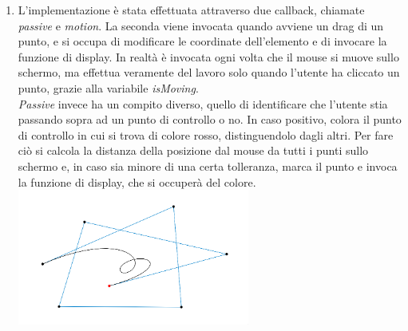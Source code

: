 \begin{enumerate}
    \item L'implementazione è stata effettuata attraverso due callback, chiamate \textit{passive} e \textit{motion}.
    La seconda viene invocata quando avviene un drag di un punto, e si occupa di modificare le coordinate dell'elemento e di invocare la funzione di display. In realtà è invocata
    ogni volta che il mouse si muove sullo schermo, ma effettua veramente del lavoro solo quando l'utente ha cliccato un punto, grazie alla variabile \textit{isMoving}.\\
    \textit{Passive} invece ha un compito diverso, quello di identificare che l'utente stia passando sopra ad un punto di controllo o no. In caso positivo, colora il punto di controllo in cui si trova di colore rosso, distinguendolo dagli altri. Per fare ciò si calcola la distanza della posizione dal mouse da tutti i punti sullo schermo e, in caso sia minore di una certa tolleranza, marca il punto e invoca la funzione di display, che si occuperà del colore.\\
           {\centering
\includegraphics[width=0.6\textwidth]{bezier.png}} 
 \end{enumerate}